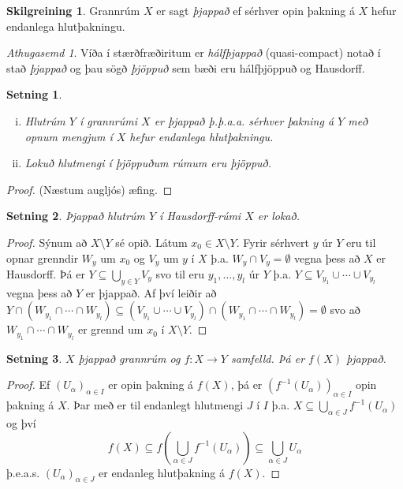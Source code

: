\documentclass[a4paper,icelandic]{book}
\theoremstyle{definition}
\newtheorem{skilgr}{Skilgreining}[section]
\theoremstyle{plain}
\newtheorem{setn}{Setning}[section]
\theoremstyle{remark}
\newtheorem*{ath}{Athugasemd}
\begin{document}
\begin{skilgr}
  Grannrúm $X$ er sagt \emph{þjappað} ef sérhver opin þakning á
  $X$ hefur endanlega hlutþakningu.
\end{skilgr}
\begin{ath}
  Víða í stærðfræðiritum er \emph{hálfþjappað}
  (quasi-compact) notað í stað \emph{þjappað} og þau sögð \emph{þjöppuð} sem
  bæði eru hálfþjöppuð og Hausdorff.
\end{ath}
\begin{setn}
  \begin{enumerate}[(i)]
  \item Hlutrúm $Y$ í grannrúmi $X$ er þjappað \emph{þ.þ.a.a.} sérhver þakning á
    $Y$ með opnum mengjum í $X$ hefur endanlega hlutþakningu.
  \item Lokuð hlutmengi í þjöppuðum rúmum eru þjöppuð.
  \end{enumerate}
\end{setn}
\begin{proof}
  (Næstum augljós) æfing.
\end{proof}
\begin{setn}
  Þjappað hlutrúm $Y$ í Hausdorff-rúmi $X$ er lokað.
\end{setn}
\begin{proof}
  Sýnum að $X\setminus Y$ sé opið. Látum $x_0\in X\setminus Y$. Fyrir sérhvert
  $y$ úr $Y$ eru til opnar grenndir $W_y$ um $x_0$ og $V_y$ um $y$ í $X$
  þ.a. $W_y\cap V_y = \emptyset$ vegna þess að $X$ er Hausdorff. Þá er
  $Y\subseteq \bigcup_{y\in Y} V_y$ svo til eru $y_1,\dots, y_l$ úr $Y$
  þ.a. $Y\subseteq V_{y_1}\cup\cdots\cup V_{y_l}$ vegna þess að $Y$ er
  þjappað. Af því leiðir að $Y\cap (W_{y_1}\cap\cdots\cap W_{y_l})\subseteq
  (V_{y_1}\cup\cdots\cup V_{y_l})\cap(W_{y_1}\cap\cdots\cap W_{y_l})=\emptyset$
  svo að $W_{y_1}\cap\cdots\cap W_{y_l}$ er grennd um $x_0$ í $X\setminus Y$.
\end{proof}
\begin{setn}
  $X$ þjappað grannrúm og $f: X\to Y$ samfelld. Þá er $f(X)$ þjappað.
\end{setn}
\begin{proof}
  Ef $(U_\alpha)_{\alpha\in I}$ er opin þakning á $f(X)$, þá er $\left(
    f^{-1}(U_\alpha)\right)_{\alpha\in I}$ opin þakning á $X$. Þar með er til
  endanlegt hlutmengi $J$ í $I$ þ.a. $X\subseteq \bigcup_{\alpha\in J}
  f^{-1}(U_\alpha)$ og því \[
  f(X)
  \subseteq f\left(\bigcup_{\alpha\in J} f^{-1}(U_\alpha)\right)
  \subseteq \bigcup_{\alpha\in J} U_\alpha
  \]
  þ.e.a.s. $(U_\alpha)_{\alpha\in J}$ er endanleg hlutþakning á $f(X)$.
\end{proof}
\end{document}
